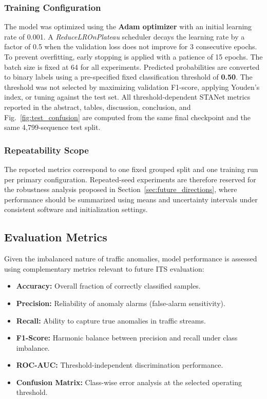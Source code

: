 \documentclass[journal]{IEEEtran}
\begin{document}
\subsubsection{Training Configuration}
The model was optimized using the \textbf{Adam optimizer} with an initial learning rate of 0.001. A \textit{ReduceLROnPlateau} scheduler decays the learning rate by a factor of 0.5 when the validation loss does not improve for 3 consecutive epochs. To prevent overfitting, early stopping is applied with a patience of 15 epochs. The batch size is fixed at 64 for all experiments. Predicted probabilities are converted to binary labels using a pre-specified fixed classification threshold of \textbf{0.50}. The threshold was not selected by maximizing validation F1-score, applying Youden's index, or tuning against the test set. All threshold-dependent STANet metrics reported in the abstract, tables, discussion, conclusion, and Fig.~\ref{fig:test_confusion} are computed from the same final checkpoint and the same 4,799-sequence test split.

\subsubsection{Repeatability Scope}
The reported metrics correspond to one fixed grouped split and one training run per primary configuration. Repeated-seed experiments are therefore reserved for the robustness analysis proposed in Section~\ref{sec:future_directions}, where performance should be summarized using means and uncertainty intervals under consistent software and initialization settings.

\subsection{Evaluation Metrics}
Given the imbalanced nature of traffic anomalies, model performance is assessed using complementary metrics relevant to future ITS evaluation:
\begin{itemize}
  \item \textbf{Accuracy:} Overall fraction of correctly classified samples.
  \item \textbf{Precision:} Reliability of anomaly alarms (false-alarm sensitivity).
  \item \textbf{Recall:} Ability to capture true anomalies in traffic streams.
  \item \textbf{F1-Score:} Harmonic balance between precision and recall under class imbalance.
  \item \textbf{ROC-AUC:} Threshold-independent discrimination performance.
  \item \textbf{Confusion Matrix:} Class-wise error analysis at the selected operating threshold.
\end{itemize}
\end{document}
